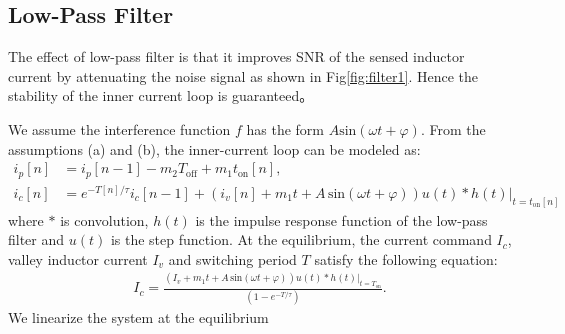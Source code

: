 \subsection{Low-Pass Filter} \label{sec:solution_subsec:lowpassfilter}
The effect of low-pass filter is that it improves SNR of the sensed inductor current by attenuating the noise signal as shown in Fig\;\ref{fig:filter1}. Hence the stability of the inner current loop is guaranteed。

We assume the interference function $f$ has the form $A\text{sin}(\omega t + \varphi)$. 
From the assumptions (a) and (b), the inner-current loop can be modeled as: 
\begin{align} \label{eqn:filter_nonlin_sys}
i_p[n] &= i_p[n-1] - m_2T_{\text{off}} +m_1t_{\text{on}}[n], \nonumber \\
i_c [n] &= e^{-T[n]/\tau}  i_c[n-1] + \left(i_v[n] + m_1 t + A \, \text{sin}(\omega  t+\varphi) \right) u(t) * h(t)\bigg\rvert_{t=t_{\text{on}}[n]}
\end{align}
where $*$ is convolution, $h(t)$ is the impulse response function of the low-pass filter and $u(t)$ is the step function.
At the equilibrium, the current command $I_c$, valley inductor current $I_v$ and switching period $T$ satisfy the following equation:
\begin{align} \label{eqn:equic}
    I_c = \frac{\left( I_v + m_1 t + A \, \text{sin}(\omega  t+\varphi) \right) u(t) * h(t)\bigg\vert_{t=T_{\text{on}}}
    }{\left(1-e^{-T/\tau}\right)}.
\end{align}
We linearize the system at the equilibrium
